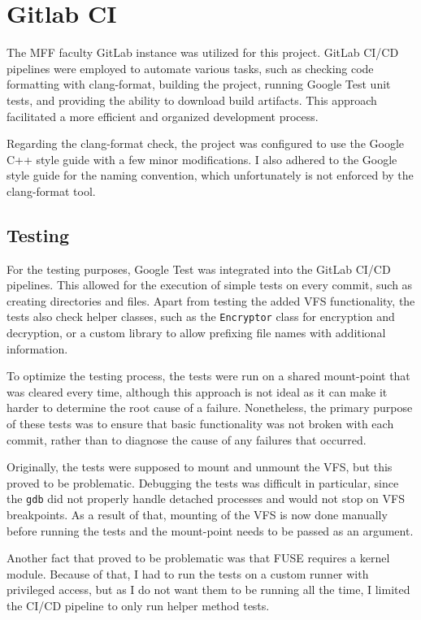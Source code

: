 \section{Gitlab CI}\label{sec:gitlab-ci}

The MFF faculty GitLab instance was utilized for this project\cite{gitlab_mff}.
GitLab CI/CD pipelines were employed to automate various tasks, such as checking code formatting with clang-format, building the project, running Google Test unit tests, and providing the ability to download build artifacts.
This approach facilitated a more efficient and organized development process.

Regarding the clang-format check, the project was configured to use the Google C++ style guide\cite{google_cpp_style_guide} with a few minor modifications.
I also adhered to the Google style guide for the naming convention, which unfortunately is not enforced by the clang-format tool.

\subsection{Testing}\label{subsec:testing}

For the testing purposes, Google Test was integrated into the GitLab CI/CD pipelines.
This allowed for the execution of simple tests on every commit, such as creating directories and files.
Apart from testing the added VFS functionality, the tests also check helper classes, such as the \texttt{Encryptor} class for encryption and decryption, or a custom library to allow prefixing file names with additional information.

To optimize the testing process, the tests were run on a shared mount-point that was cleared every time, although this approach is not ideal as it can make it harder to determine the root cause of a failure.
Nonetheless, the primary purpose of these tests was to ensure that basic functionality was not broken with each commit, rather than to diagnose the cause of any failures that occurred.

Originally, the tests were supposed to mount and unmount the VFS, but this proved to be problematic.
Debugging the tests was difficult in particular, since the \texttt{gdb} did not properly handle detached processes and would not stop on VFS breakpoints.
As a result of that, mounting of the VFS is now done manually before running the tests and the mount-point needs to be passed as an argument.

Another fact that proved to be problematic was that FUSE requires a kernel module.
Because of that, I had to run the tests on a custom runner with privileged access, but as I do not want them to be running all the time, I limited the CI/CD pipeline to only run helper method tests.


